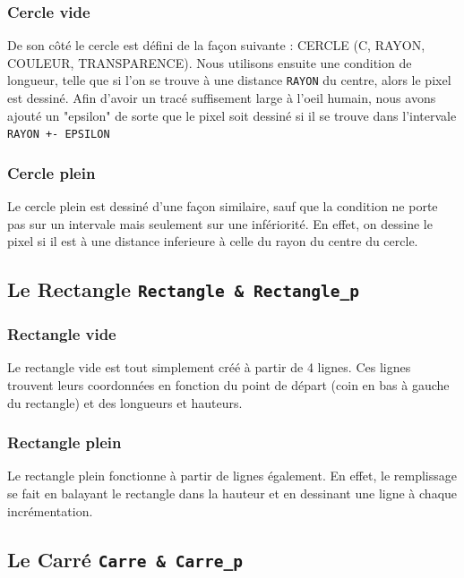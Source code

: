 \documentclass[11pt]{article}
\begin{document}
\subsubsection{Cercle vide}

De son côté le cercle est défini de la façon suivante : CERCLE (C, RAYON, COULEUR, TRANSPARENCE). Nous utilisons ensuite une condition de longueur, telle que si l'on se trouve à une distance \texttt{RAYON} du centre, alors le pixel est dessiné. Afin d'avoir un tracé suffisement large à l'oeil humain, nous avons ajouté un "epsilon" de sorte que le pixel soit dessiné si il se trouve dans l'intervale \texttt{RAYON +- EPSILON}

\subsubsection{Cercle plein}

Le cercle plein est dessiné d'une façon similaire, sauf que la condition ne porte pas sur un intervale mais seulement sur une infériorité. En effet, on dessine le pixel si il est à une distance inferieure à celle du rayon du centre du cercle.

\subsection{Le Rectangle \texttt{Rectangle \& Rectangle\_p}}

\subsubsection{Rectangle vide}

Le rectangle vide est tout simplement créé à partir de 4 lignes. Ces lignes trouvent leurs coordonnées en fonction du point de départ (coin en bas à gauche du rectangle) et des longueurs et hauteurs.

\subsubsection{Rectangle plein}

Le rectangle plein fonctionne à partir de lignes également. En effet, le remplissage se fait en balayant le rectangle dans la hauteur et en dessinant une ligne à chaque incrémentation.

\subsection{Le Carré \texttt{Carre \& Carre\_p}}
\end{document}
